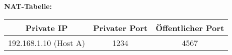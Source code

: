 \begin{enumerate}[a)]
		\bigskip \textbf{NAT-Tabelle:} \\
		\begin{tabular}{c|c|c}
			Private IP            & Privater Port & Öffentlicher Port \\ \hline
			192.168.1.10 (Host A) & 1234          & 4567
		\end{tabular}


\end{enumerate}




